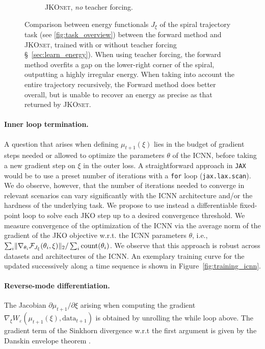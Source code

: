 \begin{figure}[t]
\begin{subfigure}[t]{0.24\textwidth}
         \caption{\textsc{JKOnet}, \protect\newline \emph{no} teacher forcing.}
     \end{subfigure}
	 \caption{Comparison between energy functionals $J_\xi$ of the spiral trajectory task (see \ref{fig:task_overview}) between the forward method and \textsc{JKOnet}, trained with or without teacher forcing \S~\ref{sec:learn_energy}). When using teacher forcing, the forward method overfits a gap on the lower-right corner of the spiral, outputting a highly irregular energy. When taking into account the entire trajectory recursively, the Forward method does better overall, but is unable to recover an energy as precise as that returned by \textsc{JKOnet}.}
	 \label{fig:exp_comp_spiral}
\end{figure}


\paragraph{Inner loop termination.} A question that arises when defining $\mu_{t+1}(\xi)$ lies in the budget of gradient steps needed or allowed to optimize the parameters $\theta$ of the ICNN, before taking a new gradient step on $\xi$ in the outer loss. A straightforward approach in \texttt{JAX} \citep{jax2018github} would be to use a preset number of iterations with a \texttt{for} loop (\texttt{jax.lax.scan}). 
We do observe, however, that the number of iterations needed to converge in relevant scenarios can vary significantly with the ICNN architecture and/or the hardness of the underlying task.
We propose to use instead a differentiable fixed-point loop to solve each \acrshort{JKO} step up to a desired convergence threshold.
We measure convergence of the optimization of the ICNN via the average norm of the gradient of the \acrshort{JKO} objective w.r.t. the ICNN parameters $\theta$, i.e., $\sum_i \lVert\nabla_{\theta_i}\mathcal{F}_{J_\xi}(\theta_i, \xi)\rVert_2/\sum_i \text{count}(\theta_i)$.
We observe that this approach is robust across datasets and architectures of the ICNN. An exemplary training curve for the  updated successively along a time sequence is shown in Figure~\ref{fig:training_icnn}.

\paragraph{Reverse-mode differentiation.} The Jacobian $\partial \mu_{t+1} / \partial\xi$ arising when computing the gradient $\nabla_\xi W_\varepsilon(\mu_{t+1}(\xi), \mathrm{data}_{t+1})$ is obtained by unrolling the while loop above. The gradient term of the Sinkhorn divergence w.r.t the first argument is given by the Danskin envelope theorem \citep{danskin2012theory}.

